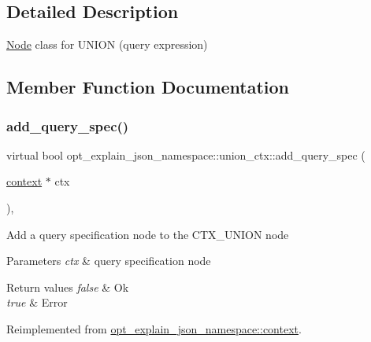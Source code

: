 \subsection{Detailed Description}
\mbox{\hyperlink{classNode}{Node}} class for U\+N\+I\+ON (query expression) 

\subsection{Member Function Documentation}
\mbox{\label{classopt__explain__json__namespace_1_1union__ctx_a8b491562c9f7455653605a74295b456d}} 
\subsubsection{\texorpdfstring{add\+\_\+query\+\_\+spec()}{add\_query\_spec()}}
{\footnotesize\ttfamily virtual bool opt\+\_\+explain\+\_\+json\+\_\+namespace\+::union\+\_\+ctx\+::add\+\_\+query\+\_\+spec (\begin{DoxyParamCaption}\item[{\mbox{\hyperlink{classopt__explain__json__namespace_1_1context}{context}} $\ast$}]{ctx }\end{DoxyParamCaption})\hspace{0.3cm}{\ttfamily [inline]}, {\ttfamily [virtual]}}

Add a query specification node to the C\+T\+X\+\_\+\+U\+N\+I\+ON node


\begin{DoxyParams}{Parameters}
{\em ctx} & query specification node\\
\hline
\end{DoxyParams}

\begin{DoxyRetVals}{Return values}
{\em false} & Ok \\
\hline
{\em true} & Error \\
\hline
\end{DoxyRetVals}


Reimplemented from \mbox{\hyperlink{classopt__explain__json__namespace_1_1context_a78bdde3b4bea092ee885bfb0647f08cb}{opt\+\_\+explain\+\_\+json\+\_\+namespace\+::context}}.

